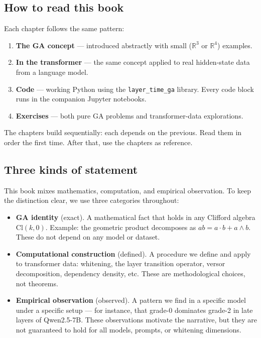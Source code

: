 \documentclass[11pt, twoside, openright]{memoir}
\newcommand{\ip}{\cdot}           %
\newcommand{\op}{\wedge}          %
\begin{document}
\subsection*{How to read this book}

Each chapter follows the same pattern:

\begin{enumerate}[nosep]
\item \textbf{The GA concept} --- introduced abstractly with small
  ($\mathbb{R}^3$ or $\mathbb{R}^4$) examples.
\item \textbf{In the transformer} --- the same concept applied to real
  hidden-state data from a language model.
\item \textbf{Code} --- working Python using the \texttt{layer\_time\_ga}
  library.  Every code block runs in the companion Jupyter notebooks.
\item \textbf{Exercises} --- both pure GA problems and transformer-data
  explorations.
\end{enumerate}

The chapters build sequentially: each depends on the previous.  Read them
in order the first time.  After that, use the chapters as reference.

\subsection*{Three kinds of statement}

This book mixes mathematics, computation, and empirical observation.  To
keep the distinction clear, we use three categories throughout:

\begin{itemize}[nosep]
\item \textbf{GA identity} (exact).  A mathematical fact that holds in any
  Clifford algebra $\mathrm{Cl}(k, 0)$.  Example: the geometric product
  decomposes as $ab = a \ip b + a \op b$.  These do not depend on any
  model or dataset.
\item \textbf{Computational construction} (defined).  A procedure we
  define and apply to transformer data: whitening, the layer transition
  operator, versor decomposition, dependency density, etc.  These are
  methodological choices, not theorems.
\item \textbf{Empirical observation} (observed).  A pattern we find in
  a specific model under a specific setup --- for instance, that grade-0
  dominates grade-2 in late layers of Qwen2.5-7B.  These observations
  motivate the narrative, but they are not guaranteed to hold for all
  models, prompts, or whitening dimensions.
\end{itemize}
\end{document}
